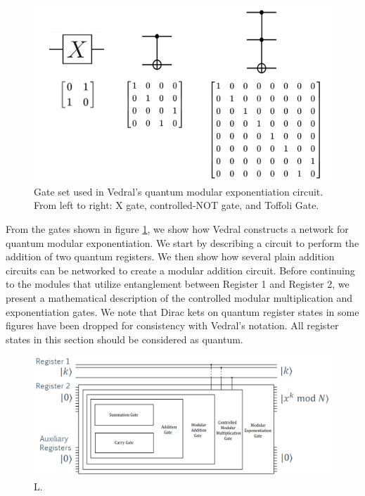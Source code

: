 \documentclass{article}
\begin{document}
\begin{figure}[!htbp]
\centering
\includegraphics[width=.7\textwidth]
{vedralgateset.png}
\captionsetup{format = hang}
\caption{Gate set used in Vedral's quantum modular exponentiation circuit. From left to right: X gate, controlled-NOT gate, and Toffoli Gate.}
\label{fig:vedralgates}
\end{figure}
From the gates shown in figure \ref{fig:vedralgates}, we show how Vedral constructs a network for quantum modular exponentiation. We start by describing a circuit to perform the addition of two quantum registers. We then show how several plain addition circuits can be networked to create a modular addition circuit. Before continuing to the modules that utilize entanglement between Register 1 and Register 2, we present a mathematical description of the controlled modular multiplication and exponentiation gates. We note that Dirac kets on quantum register states in some figures have been dropped for consistency with Vedral's notation. All register states in this section should be considered as quantum.
\begin{figure}[!htbp]
\centering
\includegraphics[width=1\textwidth]
{levelscheme.png}
\captionsetup{format = hang}
\caption{L.}
\label{fig:levelscheme}
\end{figure}
\end{document}
